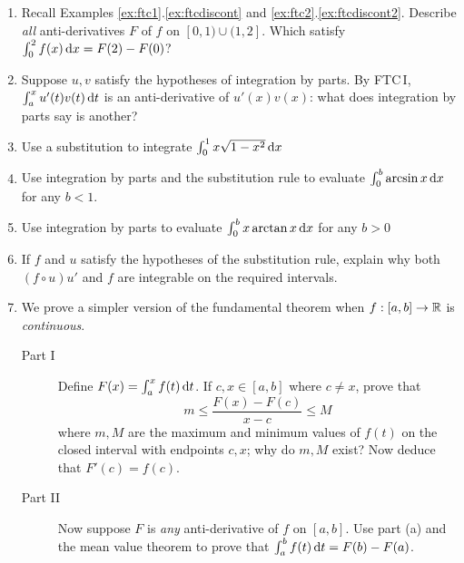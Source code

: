\begin{exercises}
\begin{enumerate}
	  
	  \item Recall Examples \ref*{ex:ftc1}.\ref{ex:ftcdiscont} and \ref*{ex:ftc2}.\ref{ex:ftcdiscont2}. Describe \emph{all} anti-derivatives $F$ of $f$ on $[0,1)\cup(1,2]$. Which satisfy $\int_0^2f(x)\,{\mathrm{d} x}=F(2)-F(0)$?
	  
	  
	  \item Suppose $u,v$ satisfy the hypotheses of integration by parts. By FTC\,I, $\int_a^xu'(t)v(t)\,{\mathrm{d} t}$ is an anti-derivative of $u'(x)v(x)$: what does integration by parts say is another?
	
	
	  \item Use a substitution to integrate $\int_0^1x\sqrt{1-x^2}\,{\mathrm{d} x}$
	  
	  
		\item Use integration by parts and the substitution rule to evaluate $\int_0^b\arcsin x\,{\mathrm{d} x}$ for any $b<1$.
	
	
	  \item Use integration by parts to evaluate $\int_0^b x\arctan x\,{\mathrm{d} x}$ for any $b>0$
	  
	  
	  \item If $f$ and $u$ satisfy the hypotheses of the substitution rule, explain why both $(f\circ u)u'$ and $f$ are integrable on the required intervals.
	
	  
	  \item\label{ex:ftceasy} We prove a simpler version of the fundamental theorem when $f:[a,b]\to\mathbb{R}$ is \emph{continuous}.
	  \begin{description}
	    \item[Part I] Define $F(x)=\int_a^xf(t)\,{\mathrm{d} t}$. If $c,x\in[a,b]$ where $c\neq x$, prove that
	    \[
	    	m\le\frac{F(x)-F(c)}{x-c}\le M
	    \]
	    where $m,M$ are the maximum and minimum values of $f(t)$ on the closed interval with endpoints $c,x$; why do $m,M$ exist? Now deduce that $F'(c)=f(c)$.
	    
	    \item[Part II] Now suppose $F$ is \emph{any} anti-derivative of $f$ on $[a,b]$. Use part (a) and the mean value theorem to prove that $\int_a^bf(t)\,{\mathrm{d} t}=F(b)-F(a)$.
	  \end{description}
	  
	  

\end{enumerate}
\end{exercises}
